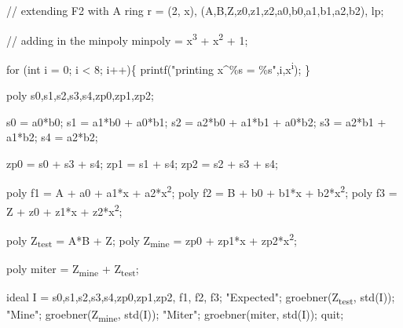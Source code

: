 \documentclass[11pt]{article}
\author{Miguel}
\date{\today}
\title{}
\begin{document}
\tableofcontents

// extending F2 with A
ring r = (2, x), (A,B,Z,z0,z1,z2,a0,b0,a1,b1,a2,b2), lp;

// adding in the minpoly 
minpoly = x\textsuperscript{3} + x\textsuperscript{2} + 1;


for (int i = 0; i < 8; i++)\{
printf("printing x\^{}\%s = \%s",i,x\textsuperscript{i});
\}

poly s0,s1,s2,s3,s4,zp0,zp1,zp2;

s0 = a0*b0;
s1 = a1*b0 + a0*b1;
s2 = a2*b0 + a1*b1 + a0*b2;
s3 = a2*b1 + a1*b2;
s4 = a2*b2;

zp0 = s0 + s3 + s4;
zp1 = s1 + s4;
zp2 = s2 + s3 + s4;

poly f1 = A + a0 + a1*x + a2*x\textsuperscript{2};
poly f2 = B + b0 + b1*x + b2*x\textsuperscript{2};
poly f3 = Z + z0 + z1*x + z2*x\textsuperscript{2};

poly Z\textsubscript{test} = A*B + Z;
poly Z\textsubscript{mine} = zp0 + zp1*x + zp2*x\textsuperscript{2};

poly miter = Z\textsubscript{mine} + Z\textsubscript{test};

ideal I = s0,s1,s2,s3,s4,zp0,zp1,zp2, f1, f2, f3;
"Expected";
groebner(Z\textsubscript{test}, std(I));
"Mine";
groebner(Z\textsubscript{mine}, std(I));
"Miter";
groebner(miter, std(I));
quit;
\end{document}
